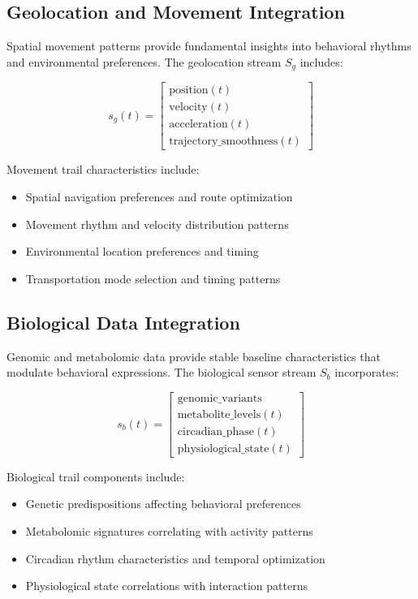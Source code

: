 \documentclass[12pt,a4paper]{article}
\begin{document}
\subsection{Geolocation and Movement Integration}

Spatial movement patterns provide fundamental insights into behavioral rhythms and environmental preferences. The geolocation stream $S_g$ includes:

$$s_g(t) = \begin{bmatrix} \text{position}(t) \\ \text{velocity}(t) \\ \text{acceleration}(t) \\ \text{trajectory\_smoothness}(t) \end{bmatrix}$$

Movement trail characteristics include:
\begin{itemize}
\item Spatial navigation preferences and route optimization
\item Movement rhythm and velocity distribution patterns
\item Environmental location preferences and timing
\item Transportation mode selection and timing patterns
\end{itemize}

\subsection{Biological Data Integration}

Genomic and metabolomic data provide stable baseline characteristics that modulate behavioral expressions. The biological sensor stream $S_b$ incorporates:

$$s_b(t) = \begin{bmatrix} \text{genomic\_variants} \\ \text{metabolite\_levels}(t) \\ \text{circadian\_phase}(t) \\ \text{physiological\_state}(t) \end{bmatrix}$$

Biological trail components include:
\begin{itemize}
\item Genetic predispositions affecting behavioral preferences
\item Metabolomic signatures correlating with activity patterns
\item Circadian rhythm characteristics and temporal optimization
\item Physiological state correlations with interaction patterns
\end{itemize}
\end{document}
